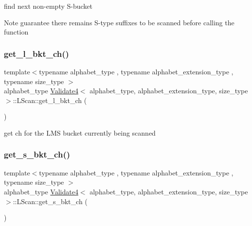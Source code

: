 find next non-\/empty S-\/bucket 

\begin{DoxyNote}{Note}
guarantee there remains S-\/type suffixes to be scanned before calling the function 
\end{DoxyNote}
\mbox{\label{struct_validate4_1_1_l_scan_ae986f4106e79412c60be8a88a9637f66}} 
\subsubsection{\texorpdfstring{get\+\_\+l\+\_\+bkt\+\_\+ch()}{get\_l\_bkt\_ch()}}
{\footnotesize\ttfamily template$<$typename alphabet\+\_\+type , typename alphabet\+\_\+extension\+\_\+type , typename size\+\_\+type $>$ \\
alphabet\+\_\+type \hyperlink{class_validate4}{Validate4}$<$ alphabet\+\_\+type, alphabet\+\_\+extension\+\_\+type, size\+\_\+type $>$\+::L\+Scan\+::get\+\_\+l\+\_\+bkt\+\_\+ch (\begin{DoxyParamCaption}{ }\end{DoxyParamCaption})\hspace{0.3cm}{\ttfamily [inline]}}



get ch for the L\+MS bucket currently being scanned 

\mbox{\label{struct_validate4_1_1_l_scan_a1be5f226a5053456897df328302764f3}} 
\subsubsection{\texorpdfstring{get\+\_\+s\+\_\+bkt\+\_\+ch()}{get\_s\_bkt\_ch()}}
{\footnotesize\ttfamily template$<$typename alphabet\+\_\+type , typename alphabet\+\_\+extension\+\_\+type , typename size\+\_\+type $>$ \\
alphabet\+\_\+type \hyperlink{class_validate4}{Validate4}$<$ alphabet\+\_\+type, alphabet\+\_\+extension\+\_\+type, size\+\_\+type $>$\+::L\+Scan\+::get\+\_\+s\+\_\+bkt\+\_\+ch (\begin{DoxyParamCaption}{ }\end{DoxyParamCaption})\hspace{0.3cm}{\ttfamily [inline]}}



